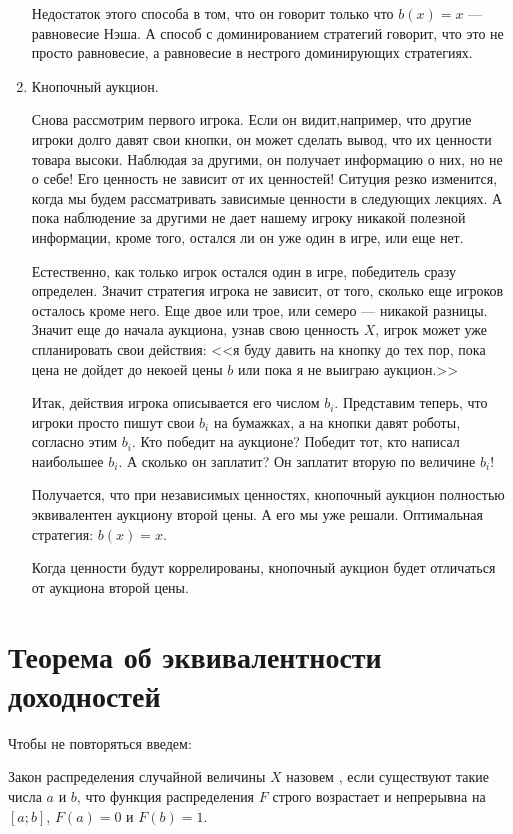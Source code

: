 \begin{enumerate}
\begin{myex}
Недостаток этого способа в том, что он говорит только что $ b(x)=x $ --- равновесие Нэша. А способ с доминированием стратегий говорит, что это не просто равновесие, а равновесие в нестрого доминирующих стратегиях.
\end{myex}

\item Кнопочный аукцион. 

Снова рассмотрим первого игрока. Если он видит,например, что другие игроки долго давят свои кнопки, он может сделать вывод, что их ценности товара высоки. Наблюдая за другими, он получает информацию о них, но не о себе! Его ценность не зависит от их ценностей! Ситуция резко изменится, когда мы будем рассматривать зависимые ценности в следующих лекциях. А пока наблюдение за другими не дает нашему игроку никакой полезной информации, кроме того, остался ли он уже один в игре, или еще нет.

Естественно, как только игрок остался один в игре, победитель сразу определен. Значит стратегия игрока не зависит, от того, сколько еще игроков осталось кроме него. Еще двое или трое, или семеро --- никакой разницы. Значит еще до начала аукциона, узнав свою ценность $ X $, игрок может уже спланировать свои действия: <<я буду давить на кнопку до тех пор, пока цена не дойдет до некоей цены $ b $ или пока я не выиграю аукцион.>> 

Итак, действия игрока описывается его числом $ b_{i} $. Представим теперь, что игроки просто пишут свои $ b_{i} $ на бумажках, а на кнопки давят роботы, согласно этим $ b_{i} $. Кто победит на аукционе? Победит тот, кто написал наибольшее $ b_{i} $. А сколько он заплатит? Он заплатит вторую по величине $ b_{i} $!

Получается, что при независимых ценностях, кнопочный аукцион полностью эквивалентен аукциону второй цены. А его мы уже решали. Оптимальная стратегия: $ b(x)=x $. 

Когда ценности будут коррелированы, кнопочный аукцион будет отличаться от аукциона второй цены.

\end{enumerate}


\section{Теорема об эквивалентности доходностей}

Чтобы не повторяться введем:

\begin{mydef}
Закон распределения случайной величины $ X $ назовем , если существуют такие числа $a$ и $b$, что функция распределения $ F $ строго возрастает и непрерывна на $ [a;b] $, $ F(a)=0 $ и $ F(b)=1 $.
\end{mydef}


